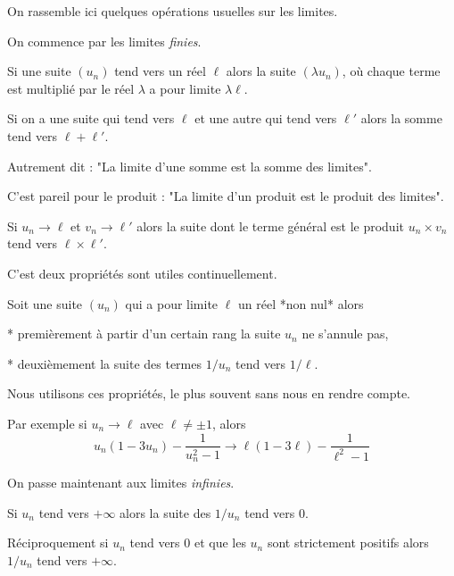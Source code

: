  \diapo

 On rassemble ici quelques opérations usuelles sur les limites.

 On commence par les limites \emph{finies}.
 
 Si une suite $(u_n)$ tend vers un réel $\ell$ alors
 la suite $(\lambda u_n)$, où chaque terme est multiplié par 
 le réel $\lambda$ a pour limite $\lambda \ell$.

 \change 
 
 Si on a une suite qui tend vers $\ell$ et une autre qui tend vers $\ell'$ alors
 la somme tend vers $\ell+\ell'$.
 
 Autrement dit : "La limite d'une somme est la somme des limites".
 
 
\change

C'est pareil pour le produit :
"La limite d'un produit est le produit des limites".

Si $u_n \to \ell$ et $v_n \to \ell'$ alors la suite dont le terme général
est le produit $u_n \times v_n$ tend vers $\ell \times \ell'$.

\change

C'est deux propriétés sont utiles continuellement.

\change

Soit une suite $(u_n)$ qui a pour limite $\ell$ un réel *non nul*
alors 

 * premièrement  à partir d'un certain rang la suite $u_n$ ne s'annule pas,
 
 * deuxièmement la suite des termes $1/u_n$ tend vers $1/\ell$.
 
 \change
 
Nous utilisons ces propriétés, le plus souvent sans nous en rendre compte.

Par exemple si $u_n \to \ell$ avec $\ell \neq \pm 1$, alors 
$$u_n(1-3u_n)-\frac{1}{u_n^2-1} \to \ell(1-3\ell) - \frac{1}{\ell^2-1}$$



\diapo

On passe maintenant aux limites \emph{infinies}.

Si $u_n$ tend vers $+\infty$ alors la suite des $1/u_n$ tend vers $0$.


\change 

Réciproquement si $u_n$ tend vers $0$ et que les $u_n$ sont strictement positifs alors 
$1/u_n$ tend vers $+\infty$.

